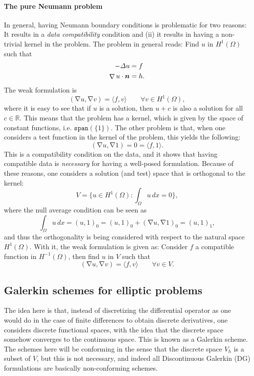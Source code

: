 \documentclass{article}
\renewcommand{\vec}{\vectorsym}
\DeclareMathOperator{\grad}{\nabla}
\newcommand{\R}{\mathbb{R}}
\begin{document}
\paragraph{The pure Neumann problem} In general, having Neumann boundary conditions is problematic for two reasons: It results in a \emph{data compatibility} condition and (ii) it results in having a non-trivial kernel in the problem. The problem in general reads: Find $u$ in $H^1(\Omega)$ such that
    $$ \begin{aligned}
        -\Delta u &= f \\
        \grad u \cdot \vec n &= h.
       \end{aligned}
    $$
The weak formulation is 
    $$ (\grad u, \grad v) = \langle f, v \rangle \qquad \forall v\in H^1(\Omega),$$
where it is easy to see that if $u$ is a solution, then $u+c$ is also a solution for all $c\in \R$. This means that the problem has a kernel, which is given by the space of constant functions, i.e. $\texttt{span}(\{1\})$. The other problem is that, when one considers a test function in the kernel of the problem, this yields the following: 
    $$ (\grad u, \grad 1) = 0 = \langle f, 1\rangle. $$
This is a compatibility condition on the data, and it shows that having compatible data is \emph{necessary} for having a well-posed formulation. Because of these reasons, one considers a solution (and test) space that is orthogonal to the kernel: 
    $$ V = \{u\in H^1(\Omega): \int_\Omega u \,dx = 0\}, $$
where the null average condition can be seen as 
    $$ \int_\Omega u \,dx = (u, 1)_0 = (u,1)_0 + (\grad u, \grad 1)_0 = (u, 1)_1, $$
and thus the orthogonality is being considered with respect to the natural space $H^1(\Omega)$. With it, the weak formulation is given as: Consider $f$ a compatible function in $H^{-1}(\Omega)$, then find $u$ in $V$ such that
    $$ (\grad u, \grad v) = \langle f, v\rangle \qquad \forall v\in V. $$

\subsection{Galerkin schemes for elliptic problems}

The idea here is that, instead of discretizing the differential operator as one would do in the case of finite differences to obtain discrete derivatives, one considers discrete functional spaces, with the idea that the discrete space somehow converges to the continuous space. This is known as a Galerkin scheme. The schemes here will be conforming in the sense that the discrete space $V_h$ is a subset of $V$, but this is not necessary, and indeed all Discontinuous Galerkin (DG) formulations are basically non-conforming schemes. 
\end{document}
